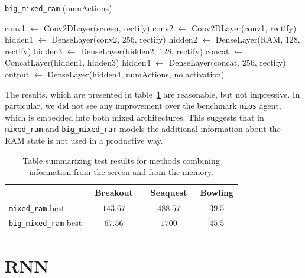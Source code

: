 \begin{algorithm}[H]
\caption{\texttt{big\_mixed\_ram} (numActions)}

\SetAlgoVlined
\DontPrintSemicolon

\vspace{0.05cm}

conv1 $\leftarrow$ Conv2DLayer(screen, rectify)\;
conv2 $\leftarrow$ Conv2DLayer(conv1, rectify)\;
hidden1 $\leftarrow$ DenseLayer(conv2, $256$, rectify)\;
hidden2 $\leftarrow$ DenseLayer(RAM, $128$, rectify)\;
hidden3 $\leftarrow$ DenseLayer(hidden2, $128$, rectify)\;
concat $\leftarrow$ ConcatLayer(hidden1, hidden3)\;
hidden4 $\leftarrow$ DenseLayer(concat, $256$, rectify)\;
output $\leftarrow$ DenseLayer(hidden4, numActions, no activation)\;

\end{algorithm}

The results, which are presented in table~\ref{table:mixed} are reasonable, but not impressive. In particular, we did not see any improvement over the benchmark \texttt{nips} agent, which is embedded into both mixed architectures. This suggests that in \texttt{mixed\_ram} and \texttt{big\_mixed\_ram} models the additional information about the RAM state is not used in a productive way.

\begin{table}[h]
\centering
\begin{tabularx}{0.7\textwidth}{ X c c c }
  \toprule
  &\ Breakout\ &\ Seaquest\ & Bowling \\
  \midrule
  \texttt{mixed\_ram} best & $143.67$ & $488.57$ & $39.5$\\
  \texttt{big\_mixed\_ram} best  & $67.56$ & $1700$ & $45.5$\\
  \bottomrule
\end{tabularx}
\caption{Table summarizing test results for methods combining information from the screen and from the memory.}
\label{table:mixed}
\end{table}

\section{RNN}

